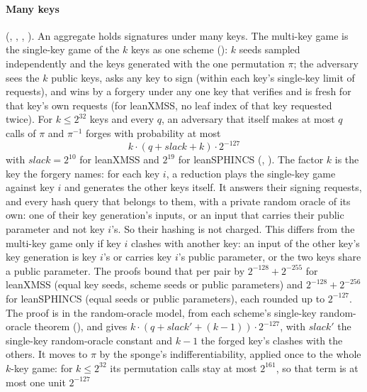 \documentclass[11pt]{article}
\begin{document}
\paragraph{Many keys} (,
,
, ). An aggregate
holds signatures under many keys. The multi-key game is the single-key game of the $k$ keys as one
scheme (): $k$ seeds sampled independently and the keys generated with the one
permutation $\pi$; the adversary sees the $k$ public keys, asks any key to sign (within each key's
single-key limit of requests), and wins by a forgery under any one key that verifies and is fresh
for that key's own requests (for leanXMSS, no leaf index of that key requested twice). For
$k \le 2^{32}$ keys and every $q$, an adversary that itself makes at most $q$ calls of $\pi$ and
$\pi^{-1}$ forges with probability at most
\[
\boxed{\ k\cdot(q + \mathit{slack} + k)\cdot 2^{-127}\ }
\]
with $\mathit{slack} = 2^{10}$ for leanXMSS and $2^{19}$ for leanSPHINCS
(, ). The factor $k$ is the
key the forgery names: for each key $i$, a reduction plays the single-key game against key $i$ and
generates the other keys itself. It answers their signing requests, and every hash query that
belongs to them, with a private random oracle of its own: one of their key generation's inputs, or
an input that carries their public parameter and not key $i$'s. So their hashing is not charged.
This differs from the multi-key game only if key $i$ clashes with another key: an input of the other
key's key generation is key $i$'s or carries key $i$'s public parameter, or the two keys share a
public parameter. The proofs bound that per pair by $2^{-128} + 2^{-255}$ for leanXMSS (equal key
seeds, scheme seeds or public parameters) and $2^{-128} + 2^{-256}$ for leanSPHINCS (equal seeds or
public parameters), each rounded up to $2^{-127}$. The proof is in the random-oracle model, from
each scheme's single-key random-oracle theorem
(), and gives
$k\cdot(q + \mathit{slack}' + (k - 1))\cdot 2^{-127}$, with $\mathit{slack}'$ the single-key
random-oracle constant and $k - 1$ the forged key's clashes with the others. It moves to $\pi$ by
the sponge's indifferentiability, applied once to the whole $k$-key game: for $k \le 2^{32}$ its
permutation calls stay at most $2^{161}$, so that term is at most one unit $2^{-127}$
\end{document}

